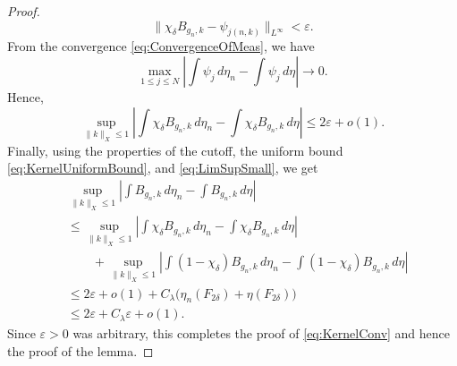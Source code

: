 \documentclass[10pt,a4paper]{amsart}
\newcommand{\eps}{\varepsilon}
\begin{document}
\begin{proof}
    \[
        \|\chi_\delta B_{g_n,k}-\psi_{j(n,k)}\|_{L^\infty}<\eps.
    \]
    From the convergence \eqref{eq:ConvergenceOfMeas}, we have
    \[
        \max_{1\leq j\leq N}
        \left|
            \int \psi_j\,d\eta_n
            -
            \int \psi_j\,d\eta
        \right|
        \to 0.
    \]
    Hence,
    \[
        \sup_{\|k\|_X\leq 1}
        \left|
            \int \chi_\delta B_{g_n,k}\,d\eta_n
            -
            \int \chi_\delta B_{g_n,k}\,d\eta
        \right|
        \leq 2\eps+o(1).
    \]
    Finally, using the properties of the cutoff, the uniform bound \eqref{eq:KernelUniformBound}, and \eqref{eq:LimSupSmall}, we get
    \begin{align*}
        &\sup_{\|k\|_X\leq 1}
        \left|
            \int B_{g_n,k}\,d\eta_n
            -
            \int B_{g_n,k}\,d\eta
        \right| \\
        &\leq
        \sup_{\|k\|_X\leq 1}
        \left|
            \int \chi_\delta B_{g_n,k}\,d\eta_n
            -
            \int \chi_\delta B_{g_n,k}\,d\eta
        \right| \\
        &\qquad
        +
        \sup_{\|k\|_X\leq 1}
        \left|
            \int (1-\chi_\delta) B_{g_n,k}\,d\eta_n
            -
            \int (1-\chi_\delta) B_{g_n,k}\,d\eta
        \right| \\
        &\leq
        2\eps+o(1)
        +
        C_\lambda\bigl(\eta_n(F_{2\delta})+\eta(F_{2\delta})\bigr) \\
        &\leq
        2\eps+C_\lambda\eps+o(1).
    \end{align*}
    Since $\eps>0$ was arbitrary, this completes the proof of \eqref{eq:KernelConv} and hence the proof of the lemma.
\end{proof}
\end{document}
